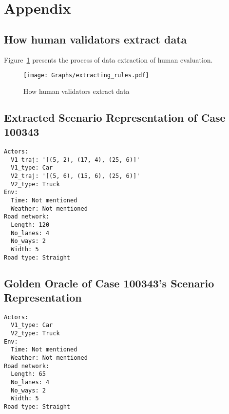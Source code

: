 \clearpage
\section{Appendix}
\subsection{How human validators extract data}

Figure~\ref{fig:human_extract} presents the process of data extraction of human evaluation.
\begin{figure}[ht]
  \centering
  \texttt{[image: Graphs/extracting\_rules.pdf]}
  \caption{How human validators extract data}
  \label{fig:human_extract}
\end{figure}
\subsection{Extracted Scenario Representation of Case 100343}
\begin{lstlisting}[caption=Scenario Representation of Case 100343, label={lst:scenario_representation}]
Actors:
  V1_traj: '[(5, 2), (17, 4), (25, 6)]'
  V1_type: Car
  V2_traj: '[(5, 6), (15, 6), (25, 6)]'
  V2_type: Truck
Env:
  Time: Not mentioned
  Weather: Not mentioned
Road network:
  Length: 120
  No_lanes: 4
  No_ways: 2
  Width: 5
Road type: Straight
\end{lstlisting}
\subsection{Golden Oracle of Case 100343's Scenario Representation}
\begin{lstlisting}[caption=Golden Oracle of Case 100343, label={lst:golden_oracle}]
Actors:
  V1_type: Car
  V2_type: Truck
Env:
  Time: Not mentioned
  Weather: Not mentioned
Road network:
  Length: 65
  No_lanes: 4
  No_ways: 2
  Width: 5
Road type: Straight
\end{lstlisting}

